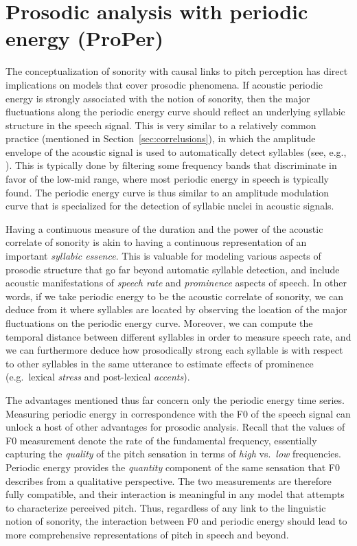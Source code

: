 \chapter{Prosodic analysis with periodic energy (ProPer)}\label{sec:properintroduction}

The conceptualization of sonority with causal links to pitch perception has direct implications on models that cover prosodic phenomena. If acoustic periodic energy is strongly associated with the notion of sonority, then the major fluctuations along the periodic energy curve should reflect an underlying syllabic structure in the speech signal. This is very similar to a relatively common practice (mentioned in Section~\ref{sec:correlusions}), in which the amplitude envelope of the acoustic signal is used to automatically detect syllables (see, e.g., \citealt{Pfitzinger1996syllablesk, galves2002sonoritysk, nakajima2017english, patha2016syllablesk, port1996dynamic, rasanen2018pre, tilsen2013speech, wang2007robust}). This is typically done by filtering some frequency bands that discriminate in favor of the low-mid range, where most periodic energy in speech is typically found. The periodic energy curve is thus similar to an amplitude modulation curve that is specialized for the detection of syllabic nuclei in acoustic signals.

Having a continuous measure of the duration and the power of the acoustic correlate of sonority is akin to having a continuous representation of an important \emph{syllabic essence}. This is valuable for modeling various aspects of prosodic structure that go far beyond automatic syllable detection, and include acoustic manifestations of \emph{speech rate} and \emph{prominence} aspects of speech.
In other words, if we take periodic energy to be the acoustic correlate of sonority, we can deduce from it where syllables are located by observing the location of the major fluctuations on the periodic energy curve. Moreover, we can compute the temporal distance between different syllables in order to measure speech rate, and we can furthermore deduce how prosodically strong each syllable is with respect to other syllables in the same utterance to estimate effects of prominence (e.g.~lexical \emph{stress} and post-lexical \emph{accents}).

The advantages mentioned thus far concern only the periodic energy time series.
Measuring periodic energy in correspondence with the F0 of the speech signal can unlock a host of other advantages for prosodic analysis.
Recall that the values of F0 measurement denote the rate of the fundamental frequency, essentially capturing the \emph{quality} of the pitch sensation in terms of \emph{high} vs.~\emph{low} frequencies. Periodic energy provides the \emph{quantity} component of the same sensation that F0 describes from a qualitative perspective.
The two measurements are therefore fully compatible, and their interaction is meaningful in any model that attempts to characterize perceived pitch.
Thus, regardless of any link to the linguistic notion of sonority, the interaction between F0 and periodic energy should lead to more comprehensive representations of pitch in speech and beyond.

